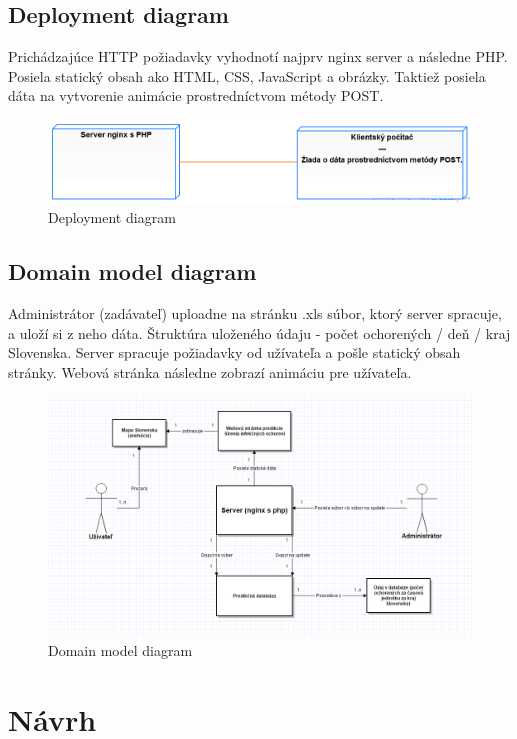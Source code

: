 \documentclass[12pt,a4paper]{report}
\begin{document}
\section[Deployment diagram]{\rmfamily\bfseries
	Deployment diagram}
Prichádzajúce HTTP požiadavky vyhodnotí najprv nginx server a následne PHP. Posiela statický obsah ako HTML, CSS, JavaScript a obrázky. Taktiež posiela dáta na vytvorenie animácie prostredníctvom métody POST.
\begin{figure}[htb]
\includegraphics[scale=0.5]{deployment}
\caption[Deployment diagram]{Deployment diagram}
 \label{fig:Deployment diagram}
\end{figure}


\section[Domain model diagram]{\rmfamily\bfseries
	Domain model diagram}
Administrátor (zadávateľ) uploadne na stránku .xls súbor, ktorý server spracuje, a uloží si z neho dáta. Štruktúra uloženého údaju - počet ochorených / deň / kraj Slovenska. Server spracuje požiadavky od užívateľa a pošle statický obsah stránky. Webová stránka následne zobrazí animáciu pre užívateľa.
\begin{figure}[htb]
\includegraphics[scale=0.5]{Domain_model_diagram}
\caption[Domain model diagram]{Domain model diagram}
 \label{fig:Domain model diagram}
\end{figure}

\renewcommand{\chaptername}{}	
\chapter[Návrh]{\rmfamily\bfseries
	Návrh}
\end{document}
